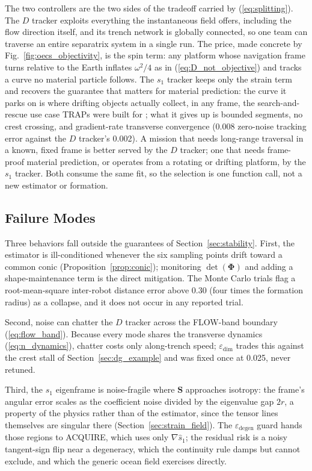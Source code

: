 \documentclass[lettersize,journal]{IEEEtran}
\begin{document}
The two controllers are the two sides of the tradeoff carried by
(\ref{eq:splitting}). The $D$ tracker exploits everything the
instantaneous field offers, including the flow direction itself, and
its trench network is globally connected, so one team can traverse an
entire separatrix system in a single run. The price, made concrete by
Fig.~\ref{fig:oecs_objectivity}, is the spin term: any platform whose
navigation frame turns relative to the Earth inflates $\omega^2/4$ as
in (\ref{eq:D_not_objective}) and tracks a curve no material particle
follows. The $s_1$ tracker keeps only the strain term and recovers the
guarantee that matters for material prediction: the curve it parks on
is where drifting objects actually collect, in any frame, the
search-and-rescue use case TRAPs were built for \cite{36}; what it
gives up is bounded segments, no crest crossing, and gradient-rate
transverse convergence (0.008 zero-noise tracking error against the $D$
tracker's 0.002). A mission that needs long-range traversal in a
known, fixed frame is better served by the $D$ tracker; one that needs
frame-proof material prediction, or operates from a rotating or
drifting platform, by the $s_1$ tracker. Both consume the same fit, so
the selection is one function call, not a new estimator or formation.

\subsection{Failure Modes}

Three behaviors fall outside the guarantees of
Section~\ref{sec:stability}. First, the estimator is ill-conditioned
whenever the six sampling points drift toward a common conic
(Proposition~\ref{prop:conic}); monitoring $\det(\boldsymbol{\Phi})$
and adding a shape-maintenance term is the direct mitigation. The Monte
Carlo trials flag a root-mean-square inter-robot distance error above
0.30 (four times the formation radius) as a collapse, and it does not
occur in any reported trial.

Second, noise can chatter the $D$ tracker across the FLOW-band
boundary (\ref{eq:flow_band}). Because every mode shares the
transverse dynamics (\ref{eq:n_dynamics}), chatter costs only
along-trench speed; $\varepsilon_{\text{dim}}$ trades this against the
crest stall of Section~\ref{sec:dg_example} and was fixed once at
0.025, never retuned.

Third, the $s_1$ eigenframe is noise-fragile where $\mathbf{S}$
approaches isotropy: the frame's angular error scales as the
coefficient noise divided by the eigenvalue gap $2r$, a property of
the physics rather than of the estimator, since the tensor lines
themselves are singular there (Section~\ref{sec:strain_field}). The
$\varepsilon_{\text{degen}}$ guard hands those regions to ACQUIRE,
which uses only $\nabla\hat{s}_1$; the residual risk is a noisy
tangent-sign flip near a degeneracy, which the continuity rule damps
but cannot exclude, and which the generic ocean field exercises
directly.
\end{document}
